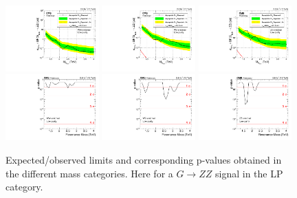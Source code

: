 \begin{figure}[h!]
\centering
\includegraphics[width=0.32\textwidth]{figures/analysis/search1/AN-15-211/limits/brazilianFlag_BulkZZ_WWLP_13TeV_wPDF.pdf}
\includegraphics[width=0.32\textwidth]{figures/analysis/search1/AN-15-211/limits/brazilianFlag_BulkZZ_WZLP_13TeV_wPDF.pdf}
\includegraphics[width=0.32\textwidth]{figures/analysis/search1/AN-15-211/limits/brazilianFlag_BulkZZ_ZZLP_13TeV_wPDF.pdf}\\
\includegraphics[width=0.32\textwidth]{figures/analysis/search1/AN-15-211/pvalues/pvalue_BulkZZinWW_low_purity.pdf}
\includegraphics[width=0.32\textwidth]{figures/analysis/search1/AN-15-211/pvalues/pvalue_BulkZZinWZ_low_purity.pdf}
\includegraphics[width=0.32\textwidth]{figures/analysis/search1/AN-15-211/pvalues/pvalue_BulkZZinZZ_low_purity.pdf}
\caption{Expected/observed limits and corresponding p-values obtained in the different mass categories. Here for a $G\rightarrow ZZ$ signal in the LP category.}
\label{fig:searchI:Limits_LPBulkZZ}
\end{figure}





